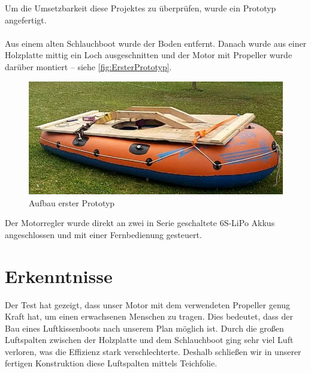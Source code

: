 Um die Umsetzbarkeit diese Projektes zu überprüfen, wurde ein Prototyp angefertigt.\\
\\
Aus einem alten Schlauchboot wurde der Boden entfernt. Danach wurde aus einer Holzplatte mittig ein Loch ausgeschnitten und der Motor mit Propeller wurde darüber montiert -- siehe \autoref{fig:ErsterPrototyp}.
\begin{figure}[h!]
  \centering
  \includegraphics[width=.95\textwidth]{./Aufbau1.jpg}
  \caption{Aufbau erster Prototyp}
  \label{fig:ErsterPrototyp}
\end{figure}

Der Motorregler wurde direkt an zwei in Serie geschaltete 6S-LiPo Akkus angeschlossen und mit einer Fernbedienung gesteuert.
\section*{Erkenntnisse}
Der Test hat gezeigt, dass unser Motor mit dem verwendeten Propeller genug Kraft hat, um einen erwachsenen Menschen zu tragen. Dies bedeutet, dass der Bau eines Luftkissenboots nach unserem Plan möglich ist. Durch die großen Luftspalten zwischen der Holzplatte und dem Schlauchboot ging sehr viel Luft verloren, was die Effizienz stark verschlechterte. Deshalb schließen wir in unserer fertigen Konstruktion diese Luftspalten mittels Teichfolie. 
